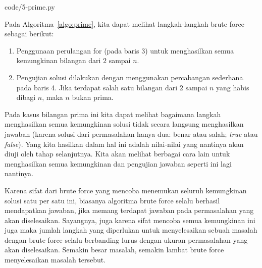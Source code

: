 

                {code/5-prime.py}

\FloatBarrier

Pada Algoritma~\ref{algo:prime}, kita dapat melihat langkah-langkah brute force sebagai berikut:

\begin{enumerate}
    \item Penggunaan perulangan for (pada baris 3) untuk menghasilkan semua kemungkinan bilangan dari $2$ sampai $n$.
    \item Pengujian solusi dilakukan dengan menggunakan percabangan sederhana pada baris 4. Jika terdapat salah satu bilangan dari $2$ sampai $n$ yang habis dibagi $n$, maka $n$ bukan prima.
\end{enumerate}


Pada kasus bilangan prima ini kita dapat melihat bagaimana langkah menghasilkan semua kemungkinan solusi tidak secara langsung menghasilkan jawaban (karena solusi dari permasalahan hanya dua: benar atau salah; \textit{true} atau \textit{false}). Yang kita hasilkan dalam hal ini adalah nilai-nilai yang nantinya akan diuji oleh tahap selanjutnya. Kita akan melihat berbagai cara lain untuk menghasilkan semua kemungkinan dan pengujian jawaban seperti ini lagi nantinya.

Karena sifat dari brute force yang mencoba menemukan seluruh kemungkinan solusi satu per satu ini, biasanya algoritma brute force selalu berhasil mendapatkan jawaban, jika memang terdapat jawaban pada permasalahan yang akan diselesaikan. Sayangnya, juga karena sifat mencoba semua kemungkinan ini juga maka jumlah langkah yang diperlukan untuk menyelesaikan sebuah masalah dengan brute force selalu berbanding lurus dengan ukuran permasalahan yang akan diselesaikan. Semakin besar masalah, semakin lambat brute force menyelesaikan masalah tersebut. 

